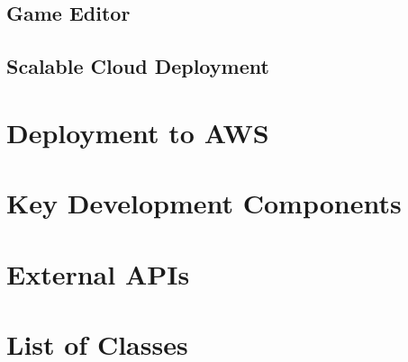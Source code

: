 	\subsection{Game Editor}
	\subsection{Scalable Cloud Deployment}

\section{Deployment to AWS}

\section{Key Development Components}

\section{External APIs}

\section{List of Classes}
